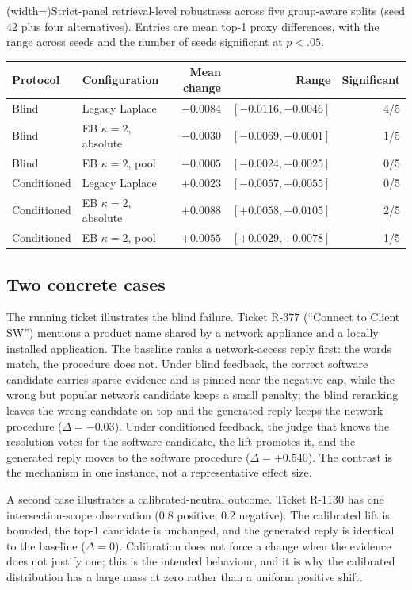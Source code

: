 \documentclass{ieeeaccess}
\begin{document}
\Table[!btp](width=\textwidth){Strict-panel retrieval-level robustness across five
group-aware splits (seed 42 plus four alternatives). Entries are mean top-1 proxy
differences, with the range across seeds and the number of seeds significant at
$p<.05$.\label{tab:seed}}{
\begin{tabular}{@{}llrrr@{}}
\toprule
Protocol & Configuration & Mean change & Range & Significant \\
\midrule
Blind & Legacy Laplace & $-0.0084$ & $[-0.0116, -0.0046]$ & 4/5 \\
Blind & EB $\kappa=2$, absolute & $-0.0030$ & $[-0.0069, -0.0001]$ & 1/5 \\
Blind & EB $\kappa=2$, pool & $-0.0005$ & $[-0.0024, +0.0025]$ & 0/5 \\
Conditioned & Legacy Laplace & $+0.0023$ & $[-0.0057, +0.0055]$ & 0/5 \\
Conditioned & EB $\kappa=2$, absolute & $+0.0088$ & $[+0.0058, +0.0105]$ & 2/5 \\
Conditioned & EB $\kappa=2$, pool & $+0.0055$ & $[+0.0029, +0.0078]$ & 1/5 \\
\bottomrule
\end{tabular}}

\subsection{Two concrete cases}
The running ticket illustrates the blind failure. Ticket R-377 (``Connect to Client
SW'') mentions a product name shared by a network appliance and a locally installed
application. The baseline ranks a network-access reply first: the words match, the
procedure does not. Under blind feedback, the correct software candidate carries
sparse evidence and is pinned near the negative cap, while the wrong but popular
network candidate keeps a small penalty; the blind reranking leaves the wrong
candidate on top and the generated reply keeps the network procedure
($\Delta=-0.03$). Under conditioned feedback, the judge that knows the resolution
votes for the software candidate, the lift promotes it, and the generated reply
moves to the software procedure ($\Delta=+0.540$). The contrast is the mechanism in
one instance, not a representative effect size.

A second case illustrates a calibrated-neutral outcome. Ticket R-1130 has one
intersection-scope observation (0.8 positive, 0.2 negative). The calibrated lift is
bounded, the top-1 candidate is unchanged, and the generated reply is identical to
the baseline ($\Delta=0$). Calibration does not force a change when the evidence
does not justify one; this is the intended behaviour, and it is why the calibrated
distribution has a large mass at zero rather than a uniform positive shift.
\end{document}
